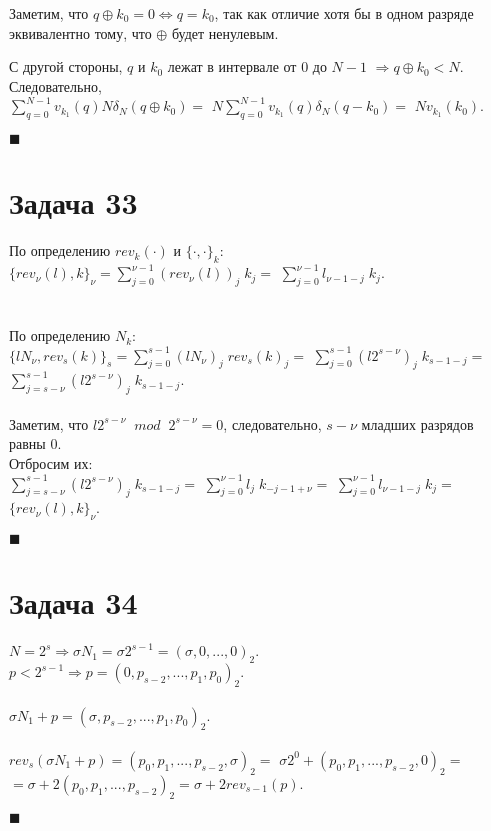 \documentclass{article}
\newcommand\proofend{\begin{flushright}$\blacksquare$\end{flushright}}
\begin{document}
{Заметим, что $q \oplus k_0 = 0 \Leftrightarrow q = k_0$, так как отличие хотя бы в одном разряде эквивалентно тому, что $\oplus$ будет ненулевым.

С другой стороны, $q$ и $k_0$ лежат в интервале от $0$ до $N -1$ $\Rightarrow q \oplus k_0 < N$. Следовательно, \\

$\sum\limits_{q=0}^{N-1}v_{k_1}(q)N\delta_N(q \oplus k_0) =$
$N\sum\limits_{q=0}^{N-1}v_{k_1}(q)\delta_N(q - k_0) =$
$Nv_{k_1}(k_0)$.
\proofend

\pagebreak

\section*{Задача 33}
По определению $rev_k(\cdot)$ и $\{ \cdot, \cdot\}_k $:\\
$\{rev_\nu(l), k\}_\nu = \sum\limits_{j=0}^{\nu - 1} (rev_\nu(l))_j\;k_j =$
$\sum\limits_{j=0}^{\nu - 1} l_{\nu - 1 - j}\;k_j$. \\ \\ \\
По определению $N_k$:\\
$\{lN_\nu, rev_s(k)\}_s = \sum\limits_{j = 0}^{s - 1} (lN_\nu)_j\;rev_s(k)_j =$
$\sum\limits_{j = 0}^{s - 1} (l2^{s-\nu})_j\;k_{s - 1 - j} =$
$\sum\limits_{j = s-\nu}^{s - 1} (l2^{s-\nu})_j\;k_{s - 1 - j}$.\\ \\
Заметим, что $l2^{s - \nu} \;\; mod \;\; 2^{s - \nu} = 0$, следовательно, $s-\nu$ младших разрядов равны 0.\\Отбросим их:\\
$\sum\limits_{j = s-\nu}^{s - 1} (l2^{s-\nu})_j\;k_{s - 1 - j}= $
$\sum\limits_{j = 0}^{\nu - 1} l_{j}\;k_{-j - 1 + \nu} = $
$\sum\limits_{j=0}^{\nu - 1} l_{\nu - 1 - j}\;k_j = $
$\{rev_\nu(l), k\}_\nu$.
\proofend

\section*{Задача 34}

$N = 2^s \Rightarrow \sigma N_1 = \sigma 2^{s - 1} = (\sigma, 0, ..., 0)_2$.\\
$p < 2^{s - 1} \Rightarrow p = (0, p_{s-2}, ..., p_1, p_0)_2.$\\ \\
$\sigma N_1 + p = (\sigma, p_{s-2}, ..., p_1, p_0)_2.$\\ \\
$rev_s(\sigma N_1 + p) = (p_0, p_1, ..., p_{s-2}, \sigma)_2 =$
$\sigma 2^0 + (p_0, p_{1}, ..., p_{s-2}, 0)_2 = $ \\
$=\sigma + 2(p_0, p_1, ..., p_{s-2})_2 = \sigma + 2rev_{s-1}(p).$
\proofend

}
\end{document}
